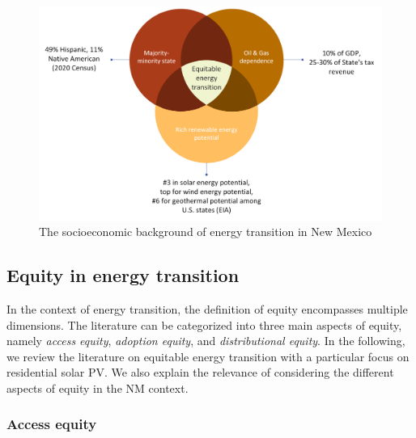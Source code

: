 \documentclass[12pt,twoside,letterpaper]{article}
\begin{document}
\begin{figure}[!ht]
    \centering
    \includegraphics[width=1\textwidth]{figures/nm_background.png}
    \caption{The socioeconomic background of energy transition in New Mexico}
    \label{fig:nm_background}
\end{figure}



\subsection{Equity in energy transition}
\label{section:equity}

In the context of energy transition, the definition of equity encompasses multiple dimensions. The literature can be categorized into three main aspects of equity, namely \textit{access equity}, \textit{adoption equity}, and \textit{distributional equity}. In the following, we review the literature on equitable energy transition with a particular focus on residential solar PV. We also explain the relevance of considering the different aspects of equity in the NM context.

\subsubsection{Access equity}
\end{document}
